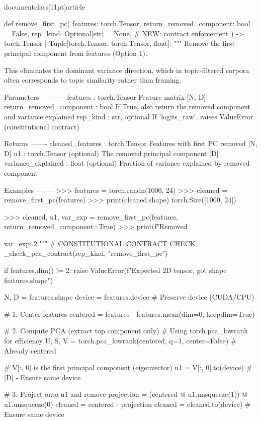 \\documentclass[11pt]{article}
\begin{document}
\begin{CodeBlock}
def remove_first_pc(
    features: torch.Tensor,
    return_removed_component: bool = False,
    rep_kind: Optional[str] = None,  # NEW: contract enforcement
) -> torch.Tensor | Tuple[torch.Tensor, torch.Tensor, float]:
    """
    Remove the first principal component from features (Option 1).
    
    This eliminates the dominant variance direction, which in topic-filtered
    corpora often corresponds to topic similarity rather than framing.
    
    Parameters
    ----------
    features : torch.Tensor
        Feature matrix [N, D]
    return_removed_component : bool
        If True, also return the removed component and variance explained
    rep_kind : str, optional
        If 'logits_raw', raises ValueError (constitutional contract)
    
    Returns
    -------
    cleaned_features : torch.Tensor
        Features with first PC removed [N, D]
    u1 : torch.Tensor (optional)
        The removed principal component [D]
    variance_explained : float (optional)
        Fraction of variance explained by removed component
    
    Examples
    --------
    >>> features = torch.randn(1000, 24)
    >>> cleaned = remove_first_pc(features)
    >>> print(cleaned.shape)
    torch.Size([1000, 24])
    
    >>> cleaned, u1, var_exp = remove_first_pc(features, return_removed_component=True)
    >>> print(f"Removed {var_exp:.2%
    """
    # CONSTITUTIONAL CONTRACT CHECK
    _check_pca_contract(rep_kind, "remove_first_pc")
    
    if features.dim() != 2:
        raise ValueError(f"Expected 2D tensor, got shape {features.shape}")
    
    N, D = features.shape
    device = features.device  # Preserve device (CUDA/CPU)
    
    # 1. Center features
    centered = features - features.mean(dim=0, keepdim=True)
    
    # 2. Compute PCA (extract top component only)
    # Using torch.pca_lowrank for efficiency
    U, S, V = torch.pca_lowrank(centered, q=1, center=False)  # Already centered
    
    # V[:, 0] is the first principal component (eigenvector)
    u1 = V[:, 0].to(device)  # [D] - Ensure same device
    
    # 3. Project onto u1 and remove
    projection = (centered @ u1.unsqueeze(1)) @ u1.unsqueeze(0)
    cleaned = centered - projection
    cleaned = cleaned.to(device)  # Ensure same device
    
}
\end{CodeBlock}
\end{document}
